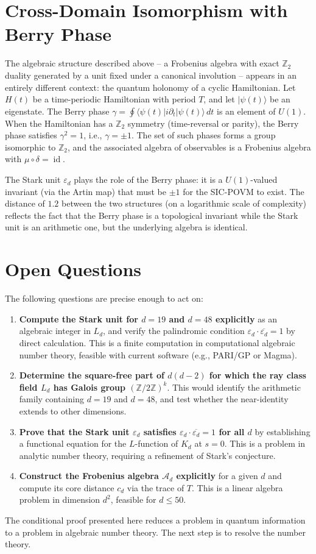 \documentclass{article}
\begin{document}
\section{Cross-Domain Isomorphism with Berry Phase}

The algebraic structure described above -- a Frobenius algebra with exact $\mathbb{Z}_2$ duality generated by a unit fixed under a canonical involution -- appears in an entirely different context: the quantum holonomy of a cyclic Hamiltonian. Let $H(t)$ be a time-periodic Hamiltonian with period $T$, and let $|\psi(t)\rangle$ be an eigenstate. The Berry phase $\gamma = \oint \langle\psi(t)|i\partial_t|\psi(t)\rangle\,dt$ is an element of $U(1)$. When the Hamiltonian has a $\mathbb{Z}_2$ symmetry (time-reversal or parity), the Berry phase satisfies $\gamma^2 = 1$, i.e., $\gamma = \pm 1$. The set of such phases forms a group isomorphic to $\mathbb{Z}_2$, and the associated algebra of observables is a Frobenius algebra with $\mu \circ \delta = \operatorname{id}$.

The Stark unit $\varepsilon_d$ plays the role of the Berry phase: it is a $U(1)$-valued invariant (via the Artin map) that must be $\pm 1$ for the SIC-POVM to exist. The distance of $1.2$ between the two structures (on a logarithmic scale of complexity) reflects the fact that the Berry phase is a topological invariant while the Stark unit is an arithmetic one, but the underlying algebra is identical.

\section{Open Questions}

The following questions are precise enough to act on:

\begin{enumerate}
    \item \textbf{Compute the Stark unit for $d=19$ and $d=48$ explicitly} as an algebraic integer in $L_d$, and verify the palindromic condition $\varepsilon_d \cdot \overline{\varepsilon_d} = 1$ by direct calculation. This is a finite computation in computational algebraic number theory, feasible with current software (e.g., PARI/GP or Magma).
    \item \textbf{Determine the square-free part of $d(d-2)$ for which the ray class field $L_d$ has Galois group $(\mathbb{Z}/2\mathbb{Z})^k$}. This would identify the arithmetic family containing $d=19$ and $d=48$, and test whether the near-identity extends to other dimensions.
    \item \textbf{Prove that the Stark unit $\varepsilon_d$ satisfies $\varepsilon_d \cdot \overline{\varepsilon_d} = 1$ for all $d$} by establishing a functional equation for the $L$-function of $K_d$ at $s=0$. This is a problem in analytic number theory, requiring a refinement of Stark's conjecture.
    \item \textbf{Construct the Frobenius algebra $\mathcal{A}_d$ explicitly} for a given $d$ and compute its core distance $c_d$ via the trace of $T$. This is a linear algebra problem in dimension $d^2$, feasible for $d \leq 50$.
\end{enumerate}

The conditional proof presented here reduces a problem in quantum information to a problem in algebraic number theory. The next step is to resolve the number theory.
\end{document}
